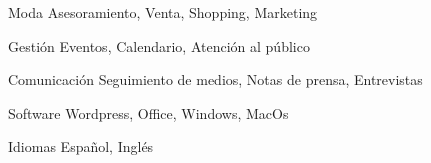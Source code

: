 

\begin{cvskills}

  \cvskill
    {Moda} %
    {Asesoramiento, Venta, Shopping, Marketing} %

  \cvskill
    {Gestión} %
    {Eventos, Calendario, Atención al público} %

  \cvskill
    {Comunicación} %
    {Seguimiento de medios, Notas de prensa, Entrevistas} %

  \cvskill
    {Software} %
    {Wordpress, Office, Windows, MacOs} %

  \cvskill
    {Idiomas} %
    {Español, Inglés} %

\end{cvskills}
